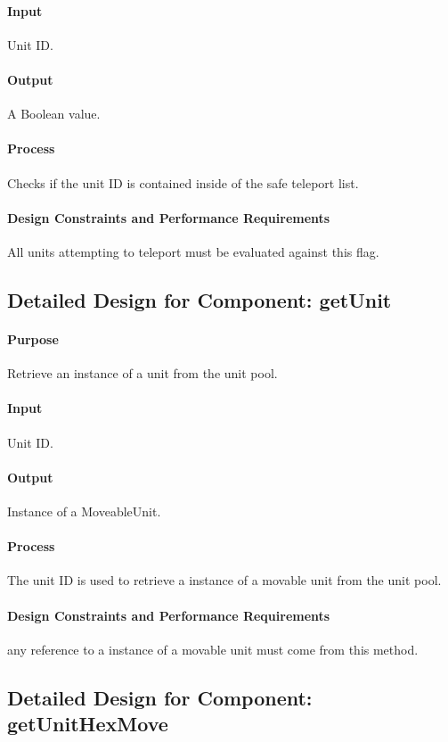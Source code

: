 \documentclass[12pt,a4paper,titlepage]{article}
\begin{document}
\paragraph{Input} Unit ID.
\paragraph{Output} A Boolean value.
\paragraph{Process} Checks if the unit ID is contained inside of the safe teleport list.
\paragraph{Design Constraints and Performance Requirements} All units attempting to teleport must be evaluated against this flag.

\subsection{Detailed Design for Component: getUnit}
\paragraph{Purpose} Retrieve an instance of a unit from the unit pool.
\paragraph{Input}  Unit ID.
\paragraph{Output} Instance of a MoveableUnit.
\paragraph{Process} The unit ID is used to retrieve a instance of a movable unit from the unit pool.
\paragraph{Design Constraints and Performance Requirements} any reference to a instance of a movable unit must come from this method.

\subsection{Detailed Design for Component: getUnitHexMove}
\end{document}
